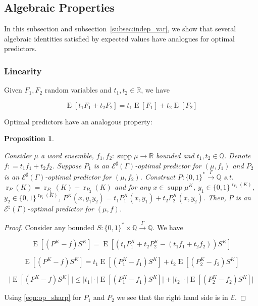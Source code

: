 \documentclass{article}
\numberwithin{equation}{section}
\theoremstyle{definition}
\theoremstyle{plain}
\newtheorem{proposition}{Proposition}[section]
\newcommand{\Bool}{\{0,1\}}
\newcommand{\Words}{{\Bool^*}}
\newcommand{\WordsLen}[1]{{\Bool^{#1}}}
\DeclareMathOperator{\Supp}{supp}
\DeclareMathOperator{\E}{E}
\DeclareMathOperator{\R}{r}
\newcommand{\Rats}{\mathbb{Q}}
\newcommand{\Reals}{\mathbb{R}}
\newcommand{\Abs}[1]{\lvert #1 \rvert}
\newcommand{\Fall}{\mathcal{E}}
\newcommand{\ESG}{\Fall^\sharp(\Gamma)}
\newcommand{\Scheme}{\xrightarrow{\Gamma}}
\begin{document}
\subsection{Algebraic Properties}

In this subsection and subsection~\ref{subsec:indep_var}, we show that several algebraic identities satisfied by expected values have analogues for optimal predictors.

\subsubsection{Linearity}

Given $F_1,F_2$ random variables and $t_1,t_2 \in \Reals$, we have 

\begin{equation}
\E[t_1 F_1 + t_2 F_2] = t_1 \E[F_1] + t_2 \E[F_2]
\end{equation}

Optimal predictors have an analogous property:

\begin{proposition}
\label{prp:linearity}

Consider $\mu$ a word ensemble, $f_1,f_2: \Supp \mu \rightarrow \Reals$ bounded and $t_1,t_2 \in \Rats$. Denote $f: = t_1 f_1 + t_2 f_2$. Suppose $P_1$ is an $\ESG$-optimal predictor for $(\mu,f_1)$ and $P_2$ is an $\ESG$-optimal predictor for $(\mu,f_2)$. Construct $P: \Words \Scheme \Rats$ s.t. $\R_P(K) = \R_{P_1}(K) + \R_{P_2}(K)$ and for any $x \in \Supp \mu^{K}$, $y_1 \in \WordsLen{\R_{P_1}(K)}$, $y_2 \in \WordsLen{\R_{P_1}(K)}$, $P^{K}(x,y_1 y_2)=t_1 P_1^{K}(x,y_1) + t_2 P_2^{K}(x, y_2)$. Then, $P$ is an $\ESG$-optimal predictor for $(\mu, f)$.

\end{proposition}

\begin{proof}

Consider any bounded $S: \Words \times \Rats \Scheme \Rats$. We have

$$\E[(P^{K} - f)S^{K}] = \E[(t_1 P_1^{K} + t_2 P_2^{K} - (t_1 f_1 + t_2 f_2))S^{K}]$$

$$\E[(P^{K} - f)S^{K}] = t_1 \E[(P_1^{K} - f_1)S^{K}] + t_2 \E[(P_2^{K} - f_2)S^{K}]$$

$$\Abs{\E[(P^{K} - f)S^{K}]} \leq \Abs{t_1} \cdot \Abs{\E[(P_1^{K} - f_1)S^{K}]} + \Abs{t_2} \cdot \Abs{\E[(P_2^{K} - f_2)S^{K}]}$$

Using \ref{eqn:op_sharp} for $P_1$ and $P_2$ we see that the right hand side is in $\Fall$.
\end{proof}
\end{document}
